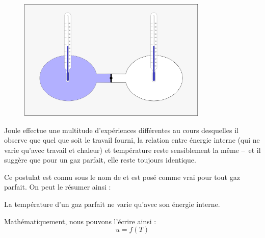 		\begin{figure}
			\begin{center}
				\includegraphics[width=9cm]{images/detente_joule_gay-lussac.png}
			\end{center}
			\label{fig_detente_joule}
		\end{figure}

		Joule effectue une multitude d’expériences différentes au cours desquelles il observe que quel que soit le travail fourni, la relation entre énergie interne (qui ne varie qu’avec travail et chaleur) et température reste sensiblement la même --\ et il suggère que pour un gaz parfait, elle reste toujours identique.

		Ce postulat est connu sous le nom de  et est posé comme vrai pour tout gaz parfait. On peut le résumer ainsi :

		\begin{trucimportant}
			La température d’un gaz parfait ne varie qu’avec son énergie interne.
		\end{trucimportant}

		Mathématiquement, nous pouvons l’écrire ainsi :
		\begin{equation}
			u = f(T)
		\end{equation}

